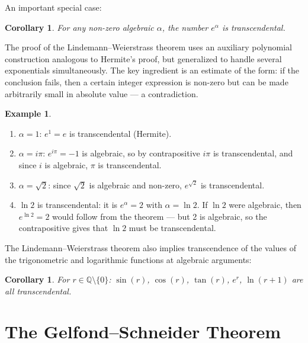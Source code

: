 \documentclass[12pt,a4paper]{amsart}
\newtheorem{corollary}[theorem]{Corollary}
\theoremstyle{definition}
\newtheorem{example}[theorem]{Example}
\begin{document}
An important special case:

\begin{corollary}
For any non-zero algebraic $\alpha$, the number $e^\alpha$ is transcendental.
\end{corollary}

The proof of the Lindemann--Weierstrass theorem uses an auxiliary polynomial
construction analogous to Hermite's proof, but generalized to handle several
exponentials simultaneously. The key ingredient is an estimate of the form:
if the conclusion fails, then a certain integer expression is non-zero but
can be made arbitrarily small in absolute value — a contradiction.

\begin{example}
\begin{enumerate}[label=(\roman*)]
  \item $\alpha = 1$: $e^1 = e$ is transcendental (Hermite).
  \item $\alpha = i\pi$: $e^{i\pi} = -1$ is algebraic, so by contrapositive
        $i\pi$ is transcendental, and since $i$ is algebraic, $\pi$ is
        transcendental.
  \item $\alpha = \sqrt{2}$: since $\sqrt{2}$ is algebraic and non-zero,
        $e^{\sqrt{2}}$ is transcendental.
  \item $\ln 2$ is transcendental: it is $e^\alpha = 2$ with $\alpha = \ln 2$.
        If $\ln 2$ were algebraic, then $e^{\ln 2} = 2$ would follow from
        the theorem — but 2 is algebraic, so the contrapositive gives that
        $\ln 2$ must be transcendental.
\end{enumerate}
\end{example}

The Lindemann--Weierstrass theorem also implies transcendence of the values
of the trigonometric and logarithmic functions at algebraic arguments:

\begin{corollary}
For $r \in \mathbb{Q} \setminus \{0\}$:
$\sin(r)$, $\cos(r)$, $\tan(r)$, $e^r$, $\ln(r+1)$ are all transcendental.
\end{corollary}


\section{The Gelfond--Schneider Theorem}
\label{sec:gelfond-schneider}
\end{document}

